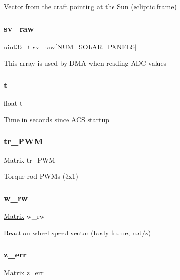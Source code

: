 Vector from the craft pointing at the Sun (ecliptic frame) \mbox{\label{struct_a_c_s_type_af83838a9c78e0c708fc7ce4b95e4609d}} 
\subsubsection{\texorpdfstring{sv\_raw}{sv\_raw}}
{\footnotesize\ttfamily uint32\+\_\+t sv\+\_\+raw\mbox{[}N\+U\+M\+\_\+\+S\+O\+L\+A\+R\+\_\+\+P\+A\+N\+E\+LS\mbox{]}}

This array is used by D\+MA when reading A\+DC values \mbox{\label{struct_a_c_s_type_afea36502e9d227ff62c5fb2719a246f2}} 
\subsubsection{\texorpdfstring{t}{t}}
{\footnotesize\ttfamily float t}

Time in seconds since A\+CS startup \mbox{\label{struct_a_c_s_type_a479836cb6277d49ac363e5aef596c7db}} 
\subsubsection{\texorpdfstring{tr\_PWM}{tr\_PWM}}
{\footnotesize\ttfamily \mbox{\hyperlink{struct___matrix}{Matrix}} tr\+\_\+\+P\+WM}

Torque rod P\+W\+Ms (3x1) \mbox{\label{struct_a_c_s_type_a880b6eef6382841a030de56f08f7c234}} 
\subsubsection{\texorpdfstring{w\_rw}{w\_rw}}
{\footnotesize\ttfamily \mbox{\hyperlink{struct___matrix}{Matrix}} w\+\_\+rw}

Reaction wheel speed vector (body frame, rad/s) \mbox{\label{struct_a_c_s_type_a36a617bb19a1c9a4cc9397c8c7775b6c}} 
\subsubsection{\texorpdfstring{z\_err}{z\_err}}
{\footnotesize\ttfamily \mbox{\hyperlink{struct___matrix}{Matrix}} z\+\_\+err}

